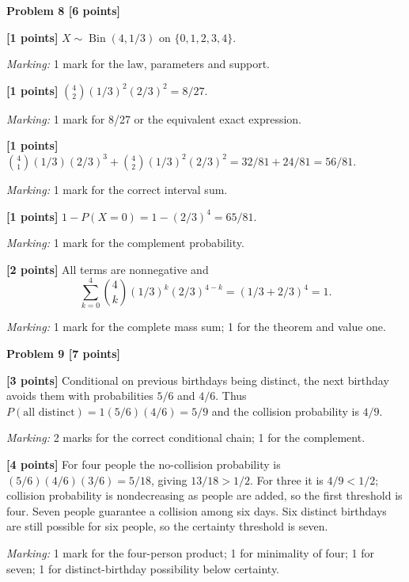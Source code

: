 \documentclass[12pt,letterpaper]{article}
\newcommand{\problemheading}[2][5\baselineskip]{\Needspace{#1}\par\noindent\hspace*{-0.625in}\textbf{#2}\par\nobreak\vspace{0.3em}}
\begin{document}
\vspace{0.65em}
\problemheading[\dimexpr 3\baselineskip+4\baselineskip\relax]{Problem 8 [6 points]}
\begin{description}[font=\normalfont,leftmargin=1.2em,labelsep=0.4em]
\item[(a)] \textbf{[1 points]} $X\sim\operatorname{Bin}(4,1/3)$ on $\{0,1,2,3,4\}$.
\par\textit{Marking:} 1 mark for the law, parameters and support.
\item[(b)] \textbf{[1 points]} $\binom42(1/3)^2(2/3)^2=8/27$.
\par\textit{Marking:} 1 mark for 8/27 or the equivalent exact expression.
\item[(c)] \textbf{[1 points]} $\binom41(1/3)(2/3)^3+\binom42(1/3)^2(2/3)^2=32/81+24/81=56/81$.
\par\textit{Marking:} 1 mark for the correct interval sum.
\item[(d)] \textbf{[1 points]} $1-P(X=0)=1-(2/3)^4=65/81$.
\par\textit{Marking:} 1 mark for the complement probability.
\item[(e)] \textbf{[2 points]} All terms are nonnegative and\[\sum_{k=0}^4\binom4k(1/3)^k(2/3)^{4-k}=(1/3+2/3)^4=1.\]
\par\textit{Marking:} 1 mark for the complete mass sum; 1 for the theorem and value one.
\end{description}
\vspace{0.65em}
\problemheading[\dimexpr 3\baselineskip+4\baselineskip\relax]{Problem 9 [7 points]}
\begin{description}[font=\normalfont,leftmargin=1.2em,labelsep=0.4em]
\item[(a)] \textbf{[3 points]} Conditional on previous birthdays being distinct, the next birthday avoids them with probabilities $5/6$ and $4/6$. Thus $P(\text{all distinct})=1(5/6)(4/6)=5/9$ and the collision probability is $4/9$.
\par\textit{Marking:} 2 marks for the correct conditional chain; 1 for the complement.
\item[(b)] \textbf{[4 points]} For four people the no-collision probability is $(5/6)(4/6)(3/6)=5/18$, giving $13/18>1/2$. For three it is $4/9<1/2$; collision probability is nondecreasing as people are added, so the first threshold is four. Seven people guarantee a collision among six days. Six distinct birthdays are still possible for six people, so the certainty threshold is seven.
\par\textit{Marking:} 1 mark for the four-person product; 1 for minimality of four; 1 for seven; 1 for distinct-birthday possibility below certainty.
\end{description}
\end{document}
